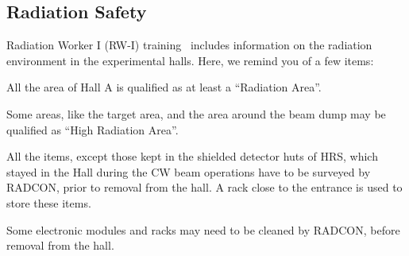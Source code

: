 

\begin{safetyen}{10}{10}
\subsection{Radiation Safety}
\end{safetyen}

Radiation Worker I (RW-I) training~\cite{RWIcebaf} includes information on the
radiation environment in the experimental halls. Here, we remind you of a few items:
 \begin{list}{--}{\setlength{\itemsep}{-0.2cm}}
    \item All the area of Hall A is qualified as at least a ``Radiation Area''.
    \item Some areas, like the target area, and the area around the beam dump may be qualified as ``High Radiation Area''.
    \item All the items, except those kept in the shielded detector huts of HRS, 
          which stayed in the Hall during the CW beam operations
          have to be surveyed by RADCON, prior to removal from the hall. 
          A rack close to the entrance is used to store these items.
    \item Some electronic modules and racks may need to be cleaned by RADCON, before
          removal from the hall.        
 \end{list}
 
